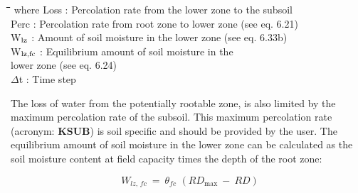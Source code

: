 \documentclass[11pt]{article}
\begin{document}
\nwln
\begin{tabbing}
\hspace{1.27cm}\=\hspace{1.27cm}\=\hspace{1.27cm}\=\hspace{1.27cm}\=%
\hspace{1.27cm}\=\hspace{1.27cm}\=\hspace{1.27cm}\=\hspace{1.27cm}\=%
\hspace{1.27cm}\=\hspace{1.27cm}\=\kill
where\> Loss\> : Percolation rate from the lower zone to the subsoil \> \> \> \> \> \> \> \> [cm d$^{{\rm -1}}$]\\
\>Perc\> : Percolation rate from root zone to lower zone (see eq. 6.21)\> \> \> \> \> \> \> \> [cm d$^{{\rm -1}}$]\\
\>W$_{{\rm lz}}$\> : Amount of soil moisture in the lower zone (see eq. 6.33b)\> \> \> \> \> \> \> \> [cm]\\
\>W$_{{\rm lz,fc}}$\> : Equilibrium amount of soil moisture in the\\
\>\>   lower zone (see eq. 6.24)\> \> \> \> \> \> \> \> [cm]\\
\>$\Delta$t\> : Time step\> \> \> 
\end{tabbing}

\bigskip
The loss of water from the potentially rootable zone, is also limited by the maximum
percolation rate of the subsoil. This maximum percolation rate (acronym: {\bf KSUB}) is soil
specific and should be provided by the user. The equilibrium amount of soil moisture in
the lower zone can be calculated as the soil moisture content at field capacity times the
depth of the root zone:

\begin{displaymath}
W _{lz,\, fc} ~=~ \theta  _{fc} \,\, (RD _{\max} ~-~RD)
\end{displaymath}
\end{document}
